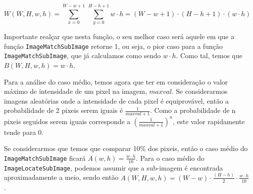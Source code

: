 \begin{equation}
	W(W,H,w,h) = \sum_{x = 0}^{W-w+1} \, \sum_{y = 0}^{H-h+1}w\cdot h = (W-w+1)\cdot(H-h+1)\cdot(w\cdot h)
\end{equation}

Importante realçar que nesta função, o seu melhor caso será aquele em que a
função \Verb|ImageMatchSubImage| retorne 1, ou seja, o pior caso para a função
\Verb|ImageMatchSubImage|, que já calculamos como sendo $w \cdot h$. Como tal,
temos que $B(W,H,w,h) = w\cdot h$.

Para a análise do caso médio, temos agora que ter em consideração o valor máximo
de intensidade de um pixel na imagem, $maxval$.
Se considerarmos imagens aleatórias onde a intensidade de cada pixel é
equiprovável, então a probabilidade de 2 pixeis serem iguais é
$\frac{1}{maxval + 1}$.
Como a probabilidade de n pixeis seguidos serem iguais corresponde a
$(\frac{1}{maxval + 1})^n$, este valor rapidamente tende para 0.

Se considerarmos que temos que comparar 10\% dos pixeis, então o caso médio do
\Verb|ImageMatchSubImage| ficará $A(w,h)= \frac{w \cdot h}{10}$.
Para o caso médio do \Verb|ImageLocateSubImage|, podemos assumir que a
sub-imagem é encontrada aproximadamente a meio, sendo então
$A(W,H,w,h)=(W-w)\cdot\frac{(H-h)}{2} \cdot \frac{w\cdot h}{10}$.
